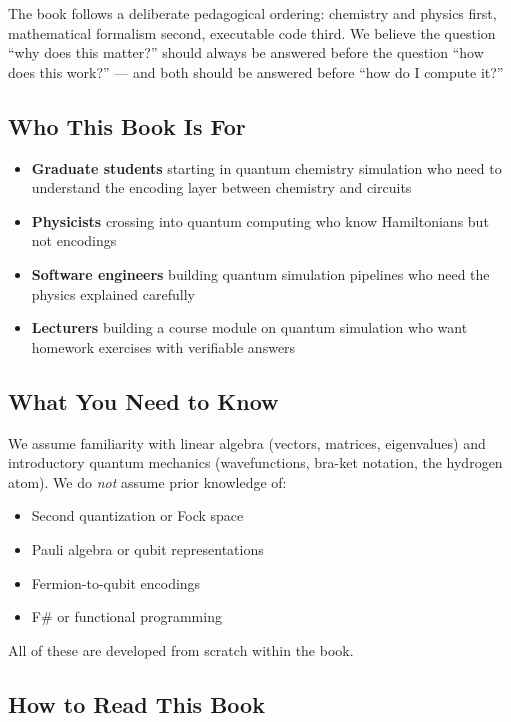 \documentclass[
  11pt,
  oneside]{book}
\providecommand{\tightlist}{%
  \setlength{\itemsep}{0pt}\setlength{\parskip}{0pt}}
\begin{document}
The book follows a deliberate pedagogical ordering: chemistry and
physics first, mathematical formalism second, executable code third. We
believe the question ``why does this matter?'' should always be answered
before the question ``how does this work?'' --- and both should be
answered before ``how do I compute it?''

\subsection{Who This Book Is For}\label{who-this-book-is-for}

\begin{itemize}
\tightlist
\item
  \textbf{Graduate students} starting in quantum chemistry simulation
  who need to understand the encoding layer between chemistry and
  circuits
\item
  \textbf{Physicists} crossing into quantum computing who know
  Hamiltonians but not encodings
\item
  \textbf{Software engineers} building quantum simulation pipelines who
  need the physics explained carefully
\item
  \textbf{Lecturers} building a course module on quantum simulation who
  want homework exercises with verifiable answers
\end{itemize}

\subsection{What You Need to Know}\label{what-you-need-to-know}

We assume familiarity with linear algebra (vectors, matrices,
eigenvalues) and introductory quantum mechanics (wavefunctions, bra-ket
notation, the hydrogen atom). We do \emph{not} assume prior knowledge
of:

\begin{itemize}
\tightlist
\item
  Second quantization or Fock space
\item
  Pauli algebra or qubit representations
\item
  Fermion-to-qubit encodings
\item
  F\# or functional programming
\end{itemize}

All of these are developed from scratch within the book.

\subsection{How to Read This Book}\label{how-to-read-this-book}
\end{document}
